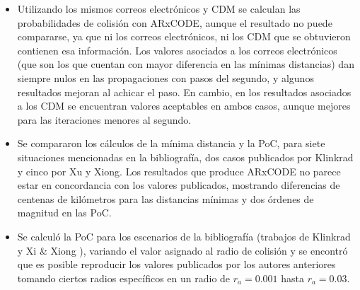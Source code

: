 \begin{itemize}
  \item Utilizando los mismos correos electr\'onicos y CDM se calculan las probabilidades de colisi\'on con ARxCODE, aunque el resultado no puede compararse, ya que ni los correos electr\'onicos, ni los CDM que se obtuvieron contienen esa informaci\'on. Los valores asociados a los correos electr\'onicos (que son los que cuentan con mayor diferencia en las m\'inimas distancias) dan siempre nulos en las propagaciones con pasos del segundo, y algunos resultados mejoran al achicar el paso. En cambio, en los resultados asociados a los CDM se encuentran valores aceptables en ambos casos, aunque mejores para las iteraciones menores al segundo.\\
  \item Se compararon los c\'alculos de la m\'inima distancia y la PoC, para siete situaciones mencionadas en la bibliograf\'ia, dos casos publicados por Klinkrad y cinco por Xu y Xiong. Los resultados que produce ARxCODE no parece estar en concordancia con los valores publicados, mostrando diferencias de centenas de kil\'ometros para las distancias m\'inimas y dos \'ordenes de magnitud en las PoC.
  \item Se calcul\'o la PoC para los escenarios de la bibliograf\'ia (trabajos de Klinkrad \citep{Klinkrad} y Xi \& Xiong \citep{xu2014method}), variando el valor asignado al radio de colisi\'on y se encontr\'o que es posible reproducir los valores publicados por los autores anteriores tomando ciertos radios espec\'ificos en un radio de $r_{a}=0.001$ hasta $r_{a}=0.03$.\\
 \end{itemize}
